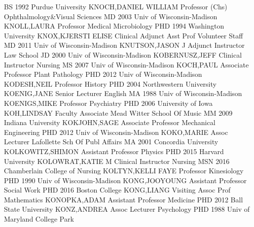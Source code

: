 \documentclass[
]{article}
\begin{document}
\textbar BS 1992 Purdue University \textbar KNOCH,DANIEL WILLIAM
\textbar{}  \textbar Professor (Chs)
\textbar Ophthalmology\&Visual Sciences \textbar MD 2003 Univ of
Wisconsin-Madison \textbar KNOLL,LAURA \textbar{} 
\textbar Professor \textbar Medical Microbiology \textbar PHD 1994
Washington University \textbar KNOX,KJERSTI ELISE \textbar{}
 \textbar Clinical Adjunct Asst Prof \textbar Volunteer
Staff \textbar MD 2011 Univ of Wisconsin-Madison \textbar KNUTSON,JASON
J \textbar{}  \textbar Adjunct Instructor \textbar Law
School \textbar JD 2000 Univ of Wisconsin-Madison
\textbar KOBERNUSZ,JEFF \textbar{}  \textbar Clinical
Instructor \textbar Nursing \textbar MS 2007 Univ of Wisconsin-Madison
\textbar KOCH,PAUL \textbar{}  \textbar Associate Professor
\textbar Plant Pathology \textbar PHD 2012 Univ of Wisconsin-Madison
\textbar KODESH,NEIL \textbar{}  \textbar Professor
\textbar History \textbar PHD 2004 Northwestern University
\textbar KOENIG,JANE \textbar{}  \textbar Senior Lecturer
\textbar English \textbar MA 1988 Univ of Wisconsin-Madison
\textbar KOENIGS,MIKE \textbar{}  \textbar Professor
\textbar Psychiatry \textbar PHD 2006 University of Iowa
\textbar KOH,LINDSAY \textbar{}  \textbar Faculty Associate
\textbar Mead Witter School Of Music \textbar MM 2009 Indiana University
\textbar KOKJOHN,SAGE \textbar{}  \textbar Associate
Professor \textbar Mechanical Engineering \textbar PHD 2012 Univ of
Wisconsin-Madison \textbar KOKO,MARIE \textbar{} 
\textbar Assoc Lecturer \textbar Lafollette Sch Of Publ Affairs
\textbar MA 2001 Concordia University \textbar KOLKOWITZ,SHIMON
\textbar{}  \textbar Assistant Professor \textbar Physics
\textbar PHD 2015 Harvard University \textbar KOLOWRAT,KATIE M
\textbar{}  \textbar Clinical Instructor \textbar Nursing
\textbar MSN 2016 Chamberlain College of Nursing \textbar KOLTYN,KELLI
FAYE \textbar{}  \textbar Professor \textbar Kinesiology
\textbar PHD 1990 Univ of Wisconsin-Madison \textbar KONG,JOOYOUNG
\textbar{}  \textbar Assistant Professor \textbar Social
Work \textbar PHD 2016 Boston College \textbar KONG,LIANG \textbar{}
 \textbar Visiting Assoc Prof \textbar Mathematics
\textbar KONOPKA,ADAM \textbar Assistant Professor \textbar{}
 \textbar Medicine \textbar PHD 2012 Ball State University
\textbar KONZ,ANDREA \textbar Assoc Lecturer \textbar{} 
\textbar Psychology \textbar PHD 1988 Univ of Maryland College Park
\end{document}
